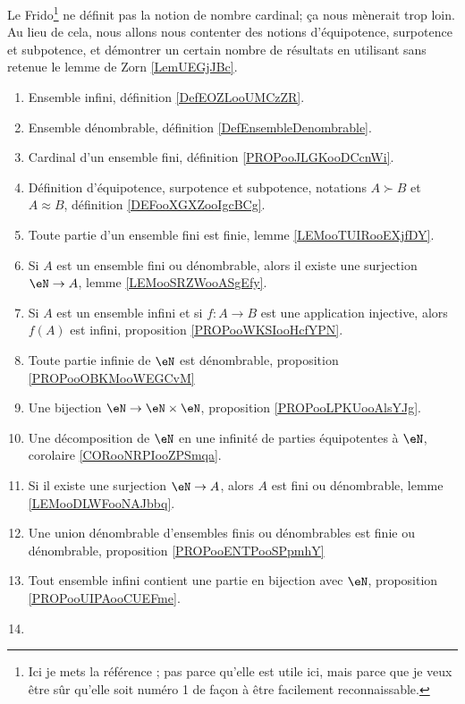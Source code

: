 

Le Frido\footnote{Ici je mets la référence \cite{MonCerveau}; pas parce qu'elle est utile ici, mais parce que je veux être sûr qu'elle soit numéro 1 de façon à être facilement reconnaissable.} ne définit pas la notion de nombre cardinal; ça nous mènerait trop loin. Au lieu de cela, nous allons nous contenter des notions d'équipotence, surpotence et subpotence, et démontrer un certain nombre de résultats en utilisant sans retenue le lemme de Zorn \ref{LemUEGjJBc}.
\begin{enumerate}
    \item
        Ensemble infini, définition \ref{DefEOZLooUMCzZR}.
    \item
        Ensemble dénombrable, définition \ref{DefEnsembleDenombrable}.
    \item
        Cardinal d'un ensemble fini, définition \ref{PROPooJLGKooDCcnWi}.
	\item
	      Définition d'équipotence, surpotence et subpotence, notations \( A\succ B\) et \( A\approx B\), définition \ref{DEFooXGXZooIgcBCg}.
	\item
	      Toute partie d'un ensemble fini est finie, lemme \ref{LEMooTUIRooEXjfDY}.
	\item
	      Si \( A\) est un ensemble fini ou dénombrable, alors il existe une surjection \( \eN\to A\), lemme \ref{LEMooSRZWooASgEfy}.
	\item
	      Si \( A\) est un ensemble infini et si \( f\colon A\to B\) est une application injective, alors \( f(A)\) est infini, proposition \ref{PROPooWKSIooHcfYPN}.
	\item
	      Toute partie infinie de \( \eN\) est dénombrable, proposition \ref{PROPooOBKMooWEGCvM}
	\item
	      Une bijection \( \eN\to \eN\times \eN\), proposition \ref{PROPooLPKUooAlsYJg}.
	\item
	      Une décomposition de \( \eN\) en une infinité de parties équipotentes à \( \eN\), corolaire \ref{CORooNRPIooZPSmqa}.
	\item
	      Si il existe une surjection \( \eN\to A\), alors \( A\) est fini ou dénombrable, lemme \ref{LEMooDLWFooNAJbbq}.
	\item
	      Une union dénombrable d'ensembles finis ou dénombrables est finie ou dénombrable, proposition \ref{PROPooENTPooSPpmhY}
	\item
	      Tout ensemble infini contient une partie en bijection avec \( \eN\), proposition \ref{PROPooUIPAooCUEFme}.
	\item

\end{enumerate}
